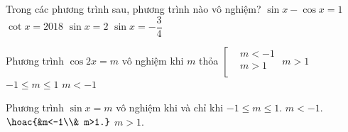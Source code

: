 \begin{ex}%
	Trong các  phương trình sau, phương trình nào vô nghiệm?
	\choice 
		{$\sin x-\cos  x=1$}
		{$\cot x=2018$} 
		 {\True $\sin x=2$}
		{$\sin x=-\dfrac{3}{4}$} 
\end{ex}

\begin{ex}%
	Phương trình $\cos 2x=m$ vô nghiệm khi $m$  thỏa
	\choice 
		 {\True $\left[
		\begin{aligned}
			&m<-1\\ 
			&m>1\\ 
	\end{aligned}\right. $}
	{$m>1$} 
	{$-1 \leqslant  m \leqslant 1$}
	 {$m<-1$}
	\loigiai{ 
		Ta có:  $\left|\cos x\right| \leqslant 1,\,\forall x \in \mathbb{R}$.\\
		Do đó, phương trình $\cos 2x=m$ vô nghiệm $ \Leftrightarrow |m|>1 \Leftrightarrow \left[ 
		\begin{aligned}
			&m<-1\\ 
			&m>1\\ 
	\end{aligned}\right. $.}
\end{ex}

\begin{ex}%
	Phương trình $\sin x=m$ vô nghiệm  khi và chỉ khi
	\def\dotEX{} 
	\choice 
		{$-1\le  m\le 1.$}
		 {$m<-1.$}
		{\True $\hoac{&m<-1\\& m>1.}$} 
		 {$m>1.$}
\end{ex}

